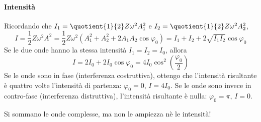 \paragraph{Intensità}
Ricordando che \(I_1 = \quotient{1}{2} Z \omega ^{2} A_1 ^{2} \) e \(I_2 = \quotient{1}{2} Z \omega ^{2} A_2 ^{2} \),
\[
	I = \frac{1}{2} Z \omega ^{2} A^{2} = \frac{1}{2} Z \omega ^{2} (A_1 ^{2} + A_2 ^{2} + 2 A_1 A_2 \cos \varphi _0 ) = I_1 + I_2 + 2 \sqrt{I_1 I_2} \cos \varphi _0
\]
Se le due onde hanno la stessa intensità \(I_1 = I_2 = I_0 \), allora 
\[
	I = 2 I_0 + 2 I_0 \cos \varphi _0 = 4 I_0 \cos ^{2} \left( \frac{\varphi _0}{2} \right)
\]
Se le onde sono in fase (interferenza costruttiva), ottengo che l'intensità risultante è quattro volte l'intensità di partenza: \(\varphi _0 = 0\), \(I= 4 I_0\). Se le onde sono invece in contro-fase (interferenza distruttiva), l'intensità risultante è nulla: \(\varphi _0 = \pi \), \(I = 0\).
\begin{note}
	Si sommano le onde complesse, ma non le ampiezza nè le intensità!
\end{note}


